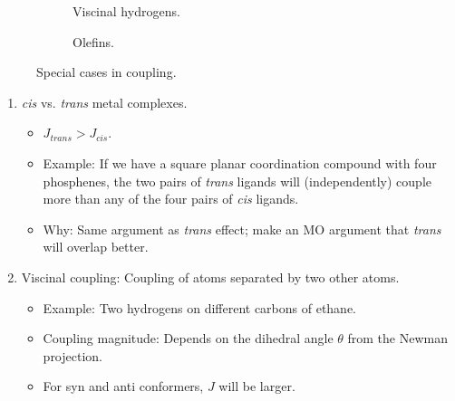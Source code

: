 \documentclass[../notes.tex]{subfiles}
\begin{document}
\begin{itemize}
\begin{figure}[h!]
\begin{subfigure}[b]{0.3\linewidth}
            \caption{Viscinal hydrogens.}
            \label{fig:couplingSpecialCaseb}
        \end{subfigure}
        \begin{subfigure}[b]{0.3\linewidth}
            \centering
            \vspace{2em}
            \caption{Olefins.}
            \label{fig:couplingSpecialCasec}
        \end{subfigure}
        \caption{Special cases in coupling.}
        \label{fig:couplingSpecialCase}
    \end{figure}
    \begin{enumerate}
        \item \emph{cis} vs. \emph{trans} metal complexes.
        \begin{itemize}
            \item $J_\textit{trans}>J_\textit{cis}$.
            \item Example: If we have a square planar coordination compound with four phosphenes, the two pairs of \emph{trans} ligands will (independently) couple more than any of the four pairs of \emph{cis} ligands.
            \item Why: Same argument as \emph{trans} effect; make an MO argument that \emph{trans} will overlap better.
        \end{itemize}
        \item Viscinal coupling: Coupling of atoms separated by two other atoms.
        \begin{itemize}
            \item Example: Two hydrogens on different carbons of ethane.
            \item Coupling magnitude: Depends on the dihedral angle $\theta$ from the Newman projection.
            \item For syn and anti conformers, $J$ will be larger.

\end{itemize}
\end{enumerate}
\end{itemize}
\end{document}
